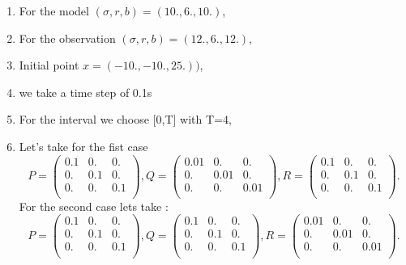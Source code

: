 \documentclass[10pt,xcolor={table,dvipsnames},t]{beamer}
\begin{document}
    \begin{frame}
        \begin{enumerate}[\textbullet]
			\item  For the model $(\sigma, r, b)=(10.,6.,10.)$,
			\item For the observation $(\sigma, r, b)=(12.,6.,12.)$,
			\item Initial point $x=(-10.,-10.,25.))$,
			\item we take a time step of 0.1s
			\item For the interval we choose [0,T] with T=4,
			\item Let's take for the fist case
			$$P=\begin{pmatrix}
            0.1 & 0. & 0. \\
            0. & 0.1 & 0. \\
            0. & 0. & 0.1 \\
            \end{pmatrix} ,
            Q=\begin{pmatrix}
            0.01 & 0. & 0. \\
            0. & 0.01 & 0. \\
            0. & 0. & 0.01 \\
            \end{pmatrix},
            R=\begin{pmatrix}
            0.1 & 0. & 0. \\
            0. & 0.1 & 0. \\
            0. & 0. & 0.1 \\
            \end{pmatrix}.$$ 
            \newline For the second case lets take :
            $$P=\begin{pmatrix}
            0.1 & 0. & 0. \\
            0. & 0.1 & 0. \\
            0. & 0. & 0.1 \\
            \end{pmatrix} ,
            Q=\begin{pmatrix}
            0.1 & 0. & 0. \\
            0. & 0.1 & 0. \\
            0. & 0. & 0.1 \\
            \end{pmatrix},
            R=\begin{pmatrix}
            0.01 & 0. & 0. \\
            0. & 0.01 & 0. \\
            0. & 0. & 0.01 \\
            \end{pmatrix}.$$ 
    	\end{enumerate}
    \end{frame}
    \begin{frame}
    \end{frame}
\end{document}
